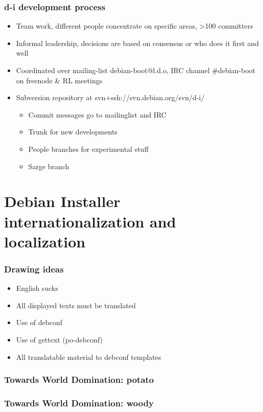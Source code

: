 \documentclass{beamer}
\begin{document}
\begin{frame}
  \frametitle{d-i development process}
	\begin{itemize}
	\item<1->
		Team work, different people concentrate on specific areas, >100 committers
	\item<1->
		Informal leadership, decisions are based on consensus or who does it first and well
	\item<1->
		Coordinated over mailing-list debian-boot@l.d.o, IRC channel \#debian-boot on freenode \& RL meetings 
	\item<2->
		Subversion repository at svn+ssh://svn.debian.org/svn/d-i/
		\begin{itemize}[<+->]
			\item<2->
				Commit messages go to mailinglist and IRC
			\item<2->
				Trunk for new developments
			\item<2->
				People branches for experimental stuff
			\item<2->
				Sarge branch
		\end{itemize}
	\end{itemize}
\end{frame}



\section{Debian Installer internationalization and localization}

\begin{frame}
  \frametitle{Drawing ideas}
	\begin{itemize}
	\item<2->
		English sucks
	\item<3->
		All displayed texts must be translated
	\item<4->
		Use of debconf
	\item<5->
		Use of gettext (po-debconf)
	\item<6->
		All translatable material to debconf templates
	\end{itemize}
\end{frame}

\begin{frame}
  \frametitle{Towards World Domination: potato}
\end{frame}

\begin{frame}
  \frametitle{Towards World Domination: woody}
\end{frame}
\end{document}
